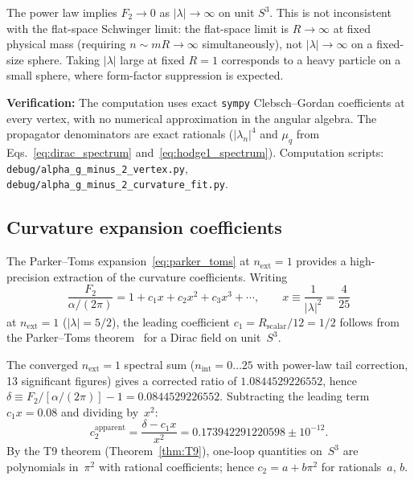 \documentclass[11pt]{article}
\begin{document}
The power law implies $F_2 \to 0$ as $|\lambda| \to \infty$ on unit $S^3$.
This is not inconsistent with the flat-space Schwinger limit: the
flat-space limit is $R \to \infty$ at fixed physical mass (requiring
$n \sim m R \to \infty$ simultaneously), not $|\lambda| \to \infty$ on
a fixed-size sphere.  Taking $|\lambda|$ large at fixed $R = 1$
corresponds to a heavy particle on a small sphere, where form-factor
suppression is expected.

\medskip
\noindent\textbf{Verification:} The computation uses exact
\texttt{sympy} Clebsch--Gordan coefficients at every vertex, with
no numerical approximation in the angular algebra.  The propagator
denominators are exact rationals ($|\lambda_n|^4$ and $\mu_q$ from
Eqs.~\eqref{eq:dirac_spectrum} and~\eqref{eq:hodge1_spectrum}).
Computation scripts: \texttt{debug/alpha\_g\_minus\_2\_vertex.py},
\texttt{debug/alpha\_g\_minus\_2\_curvature\_fit.py}.

\subsection{Curvature expansion coefficients}
\label{sec:curvature_coefficients}

The Parker--Toms expansion~\eqref{eq:parker_toms} at $n_{\mathrm{ext}}=1$
provides a high-precision extraction of the curvature coefficients.
Writing
\begin{equation}
  \frac{F_2}{\alpha/(2\pi)} = 1 + c_1 x + c_2 x^2 + c_3 x^3 + \cdots,
  \qquad x \equiv \frac{1}{|\lambda|^2} = \frac{4}{25}
  \label{eq:curvature_expansion}
\end{equation}
at $n_{\mathrm{ext}} = 1$ ($|\lambda| = 5/2$), the leading coefficient
$c_1 = R_{\mathrm{scalar}}/12 = 1/2$ follows from the Parker--Toms
theorem~\cite{parker1980} for a Dirac field on unit~$S^3$.

The converged $n_{\mathrm{ext}}=1$ spectral sum ($n_{\mathrm{int}} = 0
\ldots 25$ with power-law tail correction, 13 significant figures)
gives a corrected ratio of $1.0844529226552$, hence
$\delta \equiv F_2/[\alpha/(2\pi)] - 1 = 0.0844529226552$.
Subtracting the leading term $c_1 x = 0.08$ and dividing by~$x^2$:
\begin{equation}
  c_2^{\mathrm{apparent}} = \frac{\delta - c_1 x}{x^2}
  = 0.173942291220598 \pm 10^{-12}.
  \label{eq:c2_apparent}
\end{equation}
By the T9 theorem (Theorem~\ref{thm:T9}), one-loop quantities on~$S^3$
are polynomials in~$\pi^2$ with rational coefficients; hence
$c_2 = a + b\pi^2$ for rationals~$a$, $b$.
\end{document}
